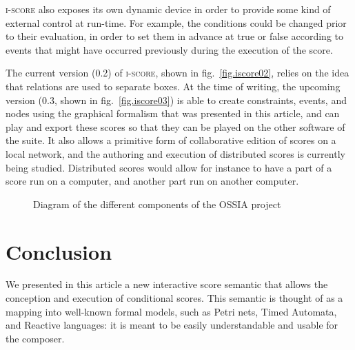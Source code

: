 \documentclass{article}
\begin{document}
    \textsc{i-score} also exposes its own dynamic device in order to provide some kind of external control at run-time. For example, the conditions could be changed prior to their evaluation, in order to set them in advance at true or false according to events that might have occurred previously during the execution of the score. 
    
    The current version (0.2) of \textsc{i-score}, shown in fig.~\ref{fig.iscore02}, relies on the idea that relations are used to separate boxes. At the time of writing, the upcoming version (0.3, shown in fig.~\ref{fig.iscore03}) is able to create constraints, events, and nodes using the graphical formalism that was presented in this article, and can play and export these scores so that they can be played on the other software of the suite.
    It also allows a primitive form of collaborative edition of scores on a local network, and the authoring and execution of distributed scores is currently being studied. Distributed scores would allow for instance to have a part of a score run on a computer, and another part run on another computer.
    
	\begin{figure}[h]
		\caption{Diagram of the different components of the OSSIA project}
		\label{fig.softwares}
	\end{figure}	
\section{Conclusion}
	We presented in this article a new interactive score semantic that allows the conception and execution of conditional scores. This semantic is thought of as a mapping into well-known formal models, such as Petri nets, Timed Automata, and Reactive languages: it is meant to be easily understandable and usable for the composer.
	
\end{document}
